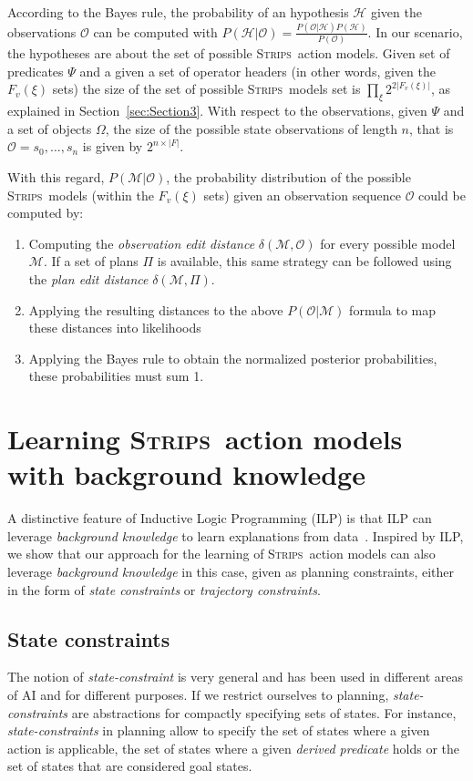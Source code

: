 \documentclass[3p,times]{elsarticle}
\newcommand{\strips}{\textsc{Strips}}     %
\begin{document}
According to the Bayes rule, the probability of an hypothesis $\mathcal{H}$ given the observations $\mathcal{O}$ can be computed with $P(\mathcal{H}|\mathcal{O})=\frac{P(\mathcal{O}|\mathcal{H})P(\mathcal{H})}{P(\mathcal{O})}$. In our scenario, the hypotheses are about the set of possible \strips\ action models. Given set of predicates $\Psi$ and a given a set of operator headers (in other words, given the $F_v(\xi)$ sets) the size of the set of possible \strips\ models set is $\prod_\xi 2^{2|F_v(\xi)|}$, as explained in Section~\ref{sec:Section3}. With respect to the observations, given $\Psi$ and a set of objects $\Omega$, the size of the possible state observations of length $n$, that is $\mathcal{O}=s_0,\ldots,s_n$ is given by $2^{n\times|F|}$. 

With this regard, $P(\mathcal{M}|\mathcal{O})$, the probability distribution of the possible \strips\ models (within the $F_v(\xi)$ sets) given an observation sequence $\mathcal{O}$ could be computed by:
\begin{enumerate}
\item Computing the {\em observation edit distance} $\delta(\mathcal{M},\mathcal{O})$ for every possible model $\mathcal{M}$. If a set of plans $\Pi$ is available, this same strategy can be followed using the {\em plan edit distance} $\delta(\mathcal{M},\Pi)$.
\item Applying the resulting distances to the above $P(\mathcal{O}|\mathcal{M})$ formula to map these distances into likelihoods
\item Applying the Bayes rule to obtain the normalized posterior probabilities, these probabilities must sum 1.
\end{enumerate}



\section{Learning \strips\ action models with background knowledge}
A distinctive feature of Inductive Logic Programming (ILP) is that ILP can leverage {\em background knowledge} to learn explanations from data~\cite{muggleton1994inductive}. Inspired by ILP, we show that our approach for the learning of \strips\ action models can also leverage {\em background knowledge} in this case, given as planning constraints, either in the form of {\em state constraints} or {\em trajectory constraints}.

\subsection{State constraints}
The notion of {\em state-constraint} is very general and has been used in different areas of AI and for different purposes.  If we restrict ourselves to planning, {\em state-constraints} are abstractions for compactly specifying sets of states. For instance, {\em state-constraints} in planning allow to specify the set of states where a given action is applicable, the set of states where a given {\em derived predicate} holds or the set of states that are considered goal states.  
\end{document}
